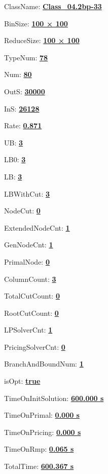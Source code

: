 \documentclass[11pt]{article}
\begin{document}
\pagestyle{empty}


ClassName: \underline{\textbf{Class_04.2bp-33}}
\par
BinSize: \underline{\textbf{100 × 100}}
\par
ReduceSize: \underline{\textbf{100 × 100}}
\par
TypeNum: \underline{\textbf{78}}
\par
Num: \underline{\textbf{80}}
\par
OutS: \underline{\textbf{30000}}
\par
InS: \underline{\textbf{26128}}
\par
Rate: \underline{\textbf{0.871}}
\par
UB: \underline{\textbf{3}}
\par
LB0: \underline{\textbf{3}}
\par
LB: \underline{\textbf{3}}
\par
LBWithCut: \underline{\textbf{3}}
\par
NodeCut: \underline{\textbf{0}}
\par
ExtendedNodeCnt: \underline{\textbf{1}}
\par
GenNodeCnt: \underline{\textbf{1}}
\par
PrimalNode: \underline{\textbf{0}}
\par
ColumnCount: \underline{\textbf{3}}
\par
TotalCutCount: \underline{\textbf{0}}
\par
RootCutCount: \underline{\textbf{0}}
\par
LPSolverCnt: \underline{\textbf{1}}
\par
PricingSolverCnt: \underline{\textbf{0}}
\par
BranchAndBoundNum: \underline{\textbf{1}}
\par
isOpt: \underline{\textbf{true}}
\par
TimeOnInitSolution: \underline{\textbf{600.000 s}}
\par
TimeOnPrimal: \underline{\textbf{0.000 s}}
\par
TimeOnPricing: \underline{\textbf{0.000 s}}
\par
TimeOnRmp: \underline{\textbf{0.065 s}}
\par
TotalTime: \underline{\textbf{600.367 s}}
\par
\newpage
\end{document}
